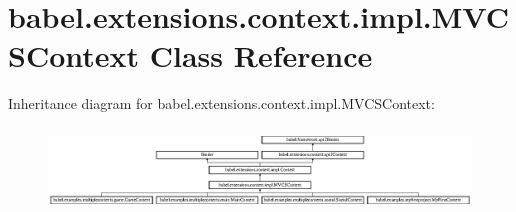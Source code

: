 \hypertarget{classbabel_1_1extensions_1_1context_1_1impl_1_1_m_v_c_s_context}{\section{babel.\-extensions.\-context.\-impl.\-M\-V\-C\-S\-Context Class Reference}
\label{classbabel_1_1extensions_1_1context_1_1impl_1_1_m_v_c_s_context}
}
Inheritance diagram for babel.\-extensions.\-context.\-impl.\-M\-V\-C\-S\-Context\-:\begin{figure}[H]
\begin{center}
\leavevmode
\includegraphics[height=2.208202cm]{classbabel_1_1extensions_1_1context_1_1impl_1_1_m_v_c_s_context}
\end{center}
\end{figure}
